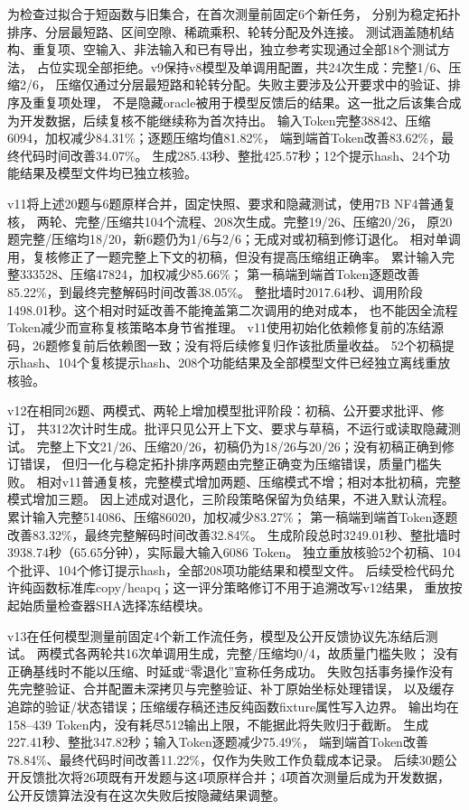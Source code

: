 \documentclass[UTF8,a4paper,11pt,fontset=fandol]{ctexart}
\begin{document}
为检查过拟合于短函数与旧集合，在首次测量前固定6个新任务，
分别为稳定拓扑排序、分层最短路、区间空隙、稀疏乘积、轮转分配及外连接。
测试涵盖随机结构、重复项、空输入、非法输入和已有导出，独立参考实现通过全部18个测试方法，
占位实现全部拒绝。v9保持v8模型及单调用配置，共24次生成：完整1/6、压缩2/6，
压缩仅通过分层最短路和轮转分配。失败主要涉及公开要求中的验证、排序及重复项处理，
不是隐藏oracle被用于模型反馈后的结果。这一批之后该集合成为开发数据，后续复核不能继续称为首次持出。
输入Token完整38842、压缩6094，加权减少84.31\%；逐题压缩均值81.82\%，
端到端首Token改善83.62\%，最终代码时间改善34.07\%。
生成285.43秒、整批425.57秒；12个提示hash、24个功能结果及模型文件均已独立核验。

v11将上述20题与6题原样合并，固定快照、要求和隐藏测试，使用7B NF4普通复核，
两轮、完整/压缩共104个流程、208次生成。完整19/26、压缩20/26，
原20题完整/压缩均18/20，新6题仍为1/6与2/6；无成对或初稿到修订退化。
相对单调用，复核修正了一题完整上下文的初稿，但没有提高压缩组正确率。
累计输入完整333528、压缩47824，加权减少85.66\%；
第一稿端到端首Token逐题改善85.22\%，到最终完整解码时间改善38.05\%。
整批墙时2017.64秒、调用阶段1498.01秒。这个相对时延改善不能掩盖第二次调用的绝对成本，
也不能因全流程Token减少而宣称复核策略本身节省推理。
v11使用初始化依赖修复前的冻结源码，26题修复前后依赖图一致；没有将后续修复归作该批质量收益。
52个初稿提示hash、104个复核提示hash、208个功能结果及全部模型文件已经独立离线重放核验。

v12在相同26题、两模式、两轮上增加模型批评阶段：初稿、公开要求批评、修订，
共312次计时生成。批评只见公开上下文、要求与草稿，不运行或读取隐藏测试。
完整上下文21/26、压缩20/26，初稿仍为18/26与20/26；没有初稿正确到修订错误，
但归一化与稳定拓扑排序两题由完整正确变为压缩错误，质量门槛失败。
相对v11普通复核，完整模式增加两题、压缩模式不增；相对本批初稿，完整模式增加三题。
因上述成对退化，三阶段策略保留为负结果，不进入默认流程。
累计输入完整514086、压缩86020，加权减少83.27\%；
第一稿端到端首Token逐题改善83.32\%，最终完整解码时间改善32.84\%。
生成阶段总时3249.01秒、整批墙时3938.74秒（65.65分钟），实际最大输入6086 Token。
独立重放核验52个初稿、104个批评、104个修订提示hash，全部208项功能结果和模型文件。
后续受检代码允许纯函数标准库copy/heapq；这一评分策略修订不用于追溯改写v12结果，
重放按起始质量检查器SHA选择冻结模块。

v13在任何模型测量前固定4个新工作流任务，模型及公开反馈协议先冻结后测试。
两模式各两轮共16次单调用生成，完整/压缩均0/4，故质量门槛失败；
没有正确基线时不能以压缩、时延或“零退化”宣称任务成功。
失败包括事务操作没有先完整验证、合并配置未深拷贝与完整验证、补丁原始坐标处理错误，
以及缓存追踪的验证/状态错误；压缩缓存稿还违反纯函数fixture属性写入边界。
输出均在158--439 Token内，没有耗尽512输出上限，不能据此将失败归于截断。
生成227.41秒、整批347.82秒；输入Token逐题减少75.49\%，
端到端首Token改善78.84\%、最终代码时间改善11.22\%，仅作为失败工作负载成本记录。
后续30题公开反馈批次将26项既有开发题与这4项原样合并；4项首次测量后成为开发数据，
公开反馈算法没有在这次失败后按隐藏结果调整。
\end{document}
